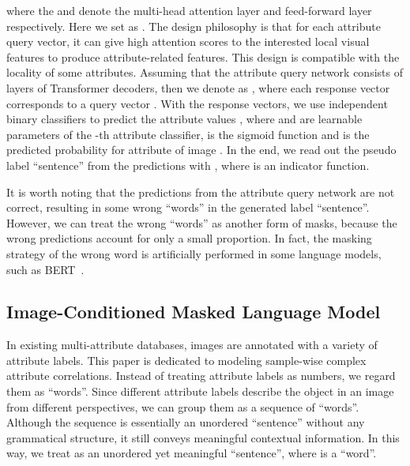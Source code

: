 \documentclass[runningheads]{llncs}
\begin{document}
where the  and  denote the multi-head attention layer and feed-forward layer respectively. Here we set  as .
The design philosophy is that for each attribute query vector, it can give high attention scores to the interested local visual features to produce attribute-related features. This design is compatible with the locality of some attributes. Assuming that the attribute query network consists of  layers of Transformer decoders, then we denote  as , where each response vector  corresponds to a query vector .
With the response vectors, we use  independent binary classifiers to predict the attribute values ,
where  and  are learnable parameters of the -th attribute classifier,  is the sigmoid function and  is the predicted probability for attribute  of image .
In the end, we read out the pseudo label ``sentence''  from the predictions  with ,
where  is an indicator function.


It is worth noting that the predictions from the attribute query network are not  correct, resulting in some wrong ``words'' in the generated label ``sentence''. However, we can treat the wrong ``words'' as another form of masks, because the wrong predictions account for only a small proportion. In fact, the masking strategy of the wrong word is artificially performed in some language models, such as BERT~\cite{devlin2018bert}. 


\subsection{Image-Conditioned Masked Language Model}
In existing multi-attribute databases, images are annotated with a variety of attribute labels. This paper is dedicated to modeling sample-wise complex attribute correlations.
Instead of treating attribute labels as numbers, we regard them as ``words''. Since different attribute labels describe the object in an image from different perspectives, we can group them as a sequence of ``words''. Although the sequence is essentially an unordered ``sentence'' without any grammatical structure, it still conveys meaningful contextual information. In this way, we treat  as an unordered yet meaningful ``sentence'', where  is a ``word''.
\end{document}
